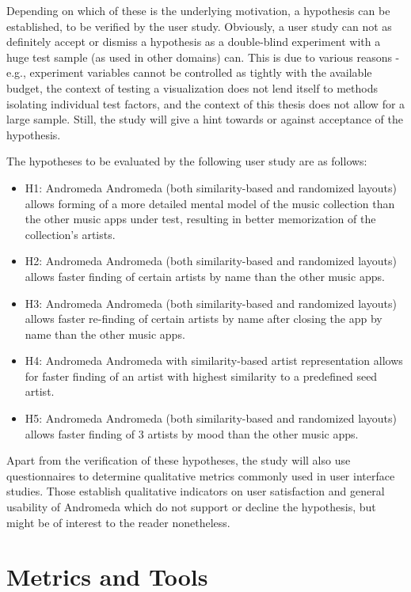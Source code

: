 Depending on which of these is the underlying motivation, a hypothesis can be established, to be verified by the user study. Obviously, a user study can not as definitely accept or dismiss a hypothesis as a double-blind experiment with a huge test sample (as used in other domains) can. This is due to various reasons - e.g., experiment variables cannot be controlled as tightly with the available budget, the context of testing a visualization does not lend itself to methods isolating individual test factors, and the context of this thesis does not allow for a large sample. Still, the study will give a hint towards or against acceptance of the hypothesis.

The hypotheses to be evaluated by the following user study are as follows:

\begin{itemize}
	\item H1: Andromeda Andromeda (both similarity-based and randomized layouts) allows forming of a more detailed mental model of the music collection than the other music apps under test, resulting in better memorization of the collection's artists.
	\item H2: Andromeda Andromeda (both similarity-based and randomized layouts) allows faster finding of certain artists by name than the other music apps.
	\item H3: Andromeda Andromeda (both similarity-based and randomized layouts) allows faster re-finding of certain artists by name after closing the app by name than the other music apps.
	\item H4: Andromeda Andromeda with similarity-based artist representation allows for faster finding of an artist with highest similarity to a predefined seed artist.
	\item H5: Andromeda Andromeda (both similarity-based and randomized layouts) allows faster finding of 3 artists by mood than the other music apps.
\end{itemize}

Apart from the verification of these hypotheses, the study will also use questionnaires to determine qualitative metrics commonly used in user interface studies. Those establish qualitative indicators on user satisfaction and general usability of Andromeda which do not support or decline the hypothesis, but might be of interest to the reader nonetheless.

\section{Metrics and Tools}

